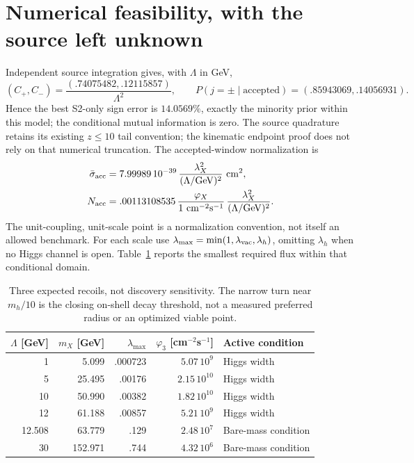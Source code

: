 \documentclass[11pt,a4paper]{article}
\begin{document}
\section{Numerical feasibility, with the source left unknown}
Independent source integration gives, with $\Lambda$ in GeV,
\begin{equation}
 (C_+,C_-)=\frac{(.74075482,.12115857)}{\Lambda^2},\qquad
 P(j=\pm\mid\mathrm{accepted})=(.85943069,.14056931).
\end{equation}
Hence the best S2-only sign error is $14.0569\%$, exactly the minority
prior within this model; the conditional mutual information is zero.
The source quadrature retains its existing $z\leq10$ tail convention;
the kinematic endpoint proof does not rely on that numerical truncation.
The accepted-window normalization is
\begin{align}
 \bar\sigma_{\rm acc}&=7.99989\,10^{-39}\,
       \frac{\lambda_X^2}{(\Lambda/{\rm GeV})^2}\ {\rm cm}^2,\\
 N_{\rm acc}&=.00113108535\,
       \frac{\varphi_X}{1\ {\rm cm}^{-2}{\rm s}^{-1}}\,
       \frac{\lambda_X^2}{(\Lambda/{\rm GeV})^2}.
\end{align}
The unit-coupling, unit-scale point is a normalization convention,
not itself an allowed benchmark. For each scale use
$\lambda_{\max}=\min(1,\lambda_{\rm vac},\lambda_h)$, omitting
$\lambda_h$ when no Higgs channel is open. Table~\ref{tab:flux}
reports the smallest required flux within that conditional domain.

\begin{table}[ht]
\centering\small
\begin{tabular}{rrrrl}
\toprule
$\Lambda$ [GeV]&$m_X$ [GeV]&$\lambda_{\max}$&
$\varphi_3$ [cm$^{-2}$s$^{-1}$]&Active condition\\
\midrule
1&5.099&.000723&$5.07\,10^9$&Higgs width\\
5&25.495&.00176&$2.15\,10^{10}$&Higgs width\\
10&50.990&.00382&$1.82\,10^{10}$&Higgs width\\
12&61.188&.00857&$5.21\,10^9$&Higgs width\\
12.508&63.779&.129&$2.48\,10^7$&Bare-mass condition\\
30&152.971&.744&$4.32\,10^6$&Bare-mass condition\\
\bottomrule
\end{tabular}
\caption{Three expected recoils, not discovery sensitivity. The narrow
turn near $m_h/10$ is the closing on-shell decay threshold, not a
measured preferred radius or an optimized viable point.}
\label{tab:flux}
\end{table}
\end{document}

